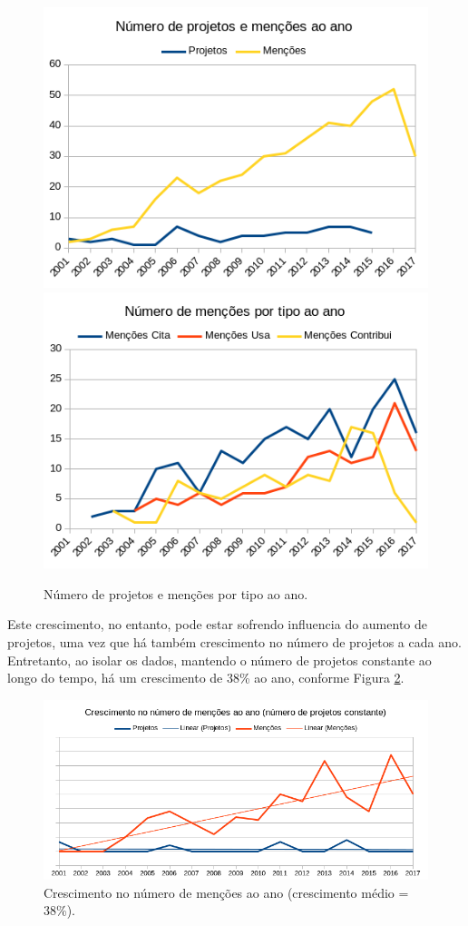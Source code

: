 \begin{figure}[h]
  \centering
  \includegraphics[scale=0.6]{imagens/mentions-projects-by-year.png}
  \includegraphics[scale=0.6]{imagens/mentions-type-by-year.png}
  \caption{Número de projetos e menções por tipo ao ano.}
  \label{mentions-by-year}
\end{figure}

Este crescimento, no entanto, pode estar sofrendo influencia do aumento de
projetos, uma vez que há também crescimento no número de projetos a cada ano.
Entretanto, ao isolar os dados, mantendo o número de projetos constante ao longo
do tempo, há um crescimento de 38\% ao ano, conforme Figura
\ref{mentions-trend}.

\begin{figure}[h]
  \center
  \includegraphics[scale=0.6]{imagens/mentions-trend.png}
  \caption{Crescimento no número de menções ao ano (crescimento médio = 38\%).}
  \label{mentions-trend}
\end{figure}

